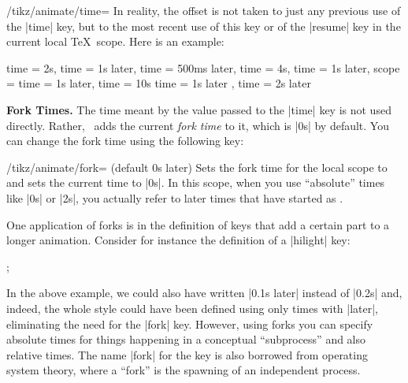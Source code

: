 \begin{key}{/tikz/animate/time=}
    In reality, the offset is not taken to just any previous use of the |time|
    key, but to the most recent use of this key or of the |resume| key in the
    current local \TeX\ scope. Here is an example:
\begin{codeexample}
time = 2s,
time = 1s later,    %
time = 500ms later, %
time = 4s,
time = 1s later,    %
scope = {           %
  time = 1s later,  %
  time = 10s
  time = 1s later   %
},                  %
time = 2s later     %
\end{codeexample}

    \medskip\textbf{Fork Times.}
    The time meant by the value  passed to the |time| key is not
    used directly. Rather, \tikzname\ adds the current \emph{fork time} to it,
    which is |0s| by default. You can change the fork time using the following
    key:
    \begin{key}{/tikz/animate/fork= (default 0s later)}
        Sets the fork time for the local scope to  and sets the current
        time to |0s|. In this scope, when you use ``absolute'' times like |0s|
        or |2s|, you actually refer to later times that have started as
        .

        One application of forks is in the definition of keys that add a
        certain part to a longer animation. Consider for instance the
        definition of a |hilight| key:
\begin{codeexample}[
    preamble={\usetikzlibrary{animations}},
    animation list={1.05,1.1,1.15,1.2,2.05,2.1,2.15,2.2},
]
\tikz [animate/highlight/.style = {
    scope = { fork = #1,
              :fill = { 0s = "black", 0.1s = "white", 0.2s = "black"} }
  }]
  ;
\end{codeexample}
        In the above example, we could also have written |0.1s later| instead
        of |0.2s| and, indeed, the whole style could have been defined using
        only times with |later|, eliminating the need for the |fork| key.
        However, using forks you can specify absolute times for things
        happening in a conceptual ``subprocess'' and also relative times. The
        name |fork| for the key is also borrowed from operating system theory,
        where a ``fork'' is the spawning of an independent process.
    \end{key}


\end{key}
